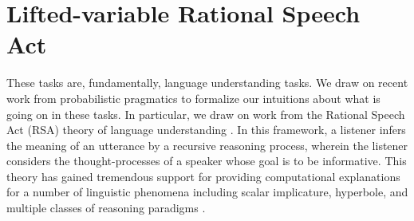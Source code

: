 \documentclass[10pt,letterpaper]{article}
\begin{document}
%
%



\section{Lifted-variable Rational Speech Act}


These tasks are, fundamentally, language understanding tasks. We draw on recent work from probabilistic pragmatics to formalize our intuitions about what is going on in these tasks. In particular, we draw on work from the Rational Speech Act (RSA) theory of language understanding \cite{Frank2012,Goodman2013}. In this framework, a listener infers the meaning of an utterance by a recursive reasoning process, wherein the listener considers the thought-processes of a speaker whose goal is to be informative. This theory has gained tremendous support for providing computational explanations for a number of linguistic phenomena including scalar implicature, hyperbole, and multiple classes of reasoning paradigms \cite{Kao2014, Tessler2014, Lassiter2014}. 
\end{document}
